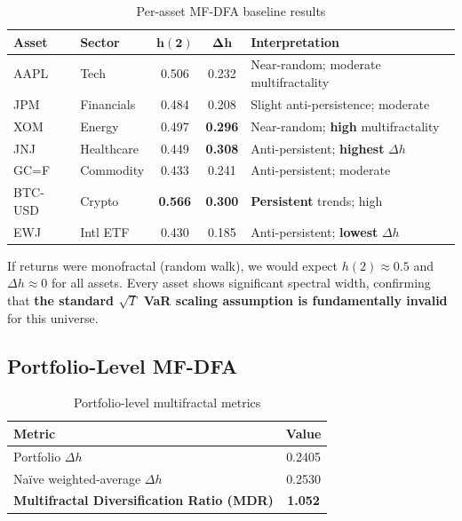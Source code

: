 \documentclass[11pt,a4paper]{article}
\begin{document}
\begin{table}[H]
\centering
\caption{Per-asset MF-DFA baseline results}
\label{tab:baseline}
\begin{tabular}{llccl}
\toprule
\textbf{Asset} & \textbf{Sector} & $\boldsymbol{h(2)}$ & $\boldsymbol{\Delta h}$ & \textbf{Interpretation} \\
\midrule
AAPL    & Tech        & 0.506 & 0.232 & Near-random; moderate multifractality \\
JPM     & Financials  & 0.484 & 0.208 & Slight anti-persistence; moderate \\
XOM     & Energy      & 0.497 & \textbf{0.296} & Near-random; \textbf{high} multifractality \\
JNJ     & Healthcare  & 0.449 & \textbf{0.308} & Anti-persistent; \textbf{highest} $\Delta h$ \\
GC=F    & Commodity   & 0.433 & 0.241 & Anti-persistent; moderate \\
BTC-USD & Crypto      & \textbf{0.566} & \textbf{0.300} & \textbf{Persistent} trends; high \\
EWJ     & Intl ETF    & 0.430 & 0.185 & Anti-persistent; \textbf{lowest} $\Delta h$ \\
\bottomrule
\end{tabular}
\end{table}

\begin{importantbox}
If returns were monofractal (random walk), we would expect $h(2) \approx 0.5$ and $\Delta h \approx 0$ for all assets. Every asset shows significant spectral width, confirming that \textbf{the standard $\sqrt{T}$ VaR scaling assumption is fundamentally invalid} for this universe.
\end{importantbox}

\subsection{Portfolio-Level MF-DFA}

\begin{table}[H]
\centering
\caption{Portfolio-level multifractal metrics}
\label{tab:portfolio}
\begin{tabular}{lc}
\toprule
\textbf{Metric} & \textbf{Value} \\
\midrule
Portfolio $\Delta h$ & 0.2405 \\
Na\"ive weighted-average $\Delta h$ & 0.2530 \\
\textbf{Multifractal Diversification Ratio (MDR)} & \textbf{1.052} \\
\bottomrule
\end{tabular}
\end{table}
\end{document}
